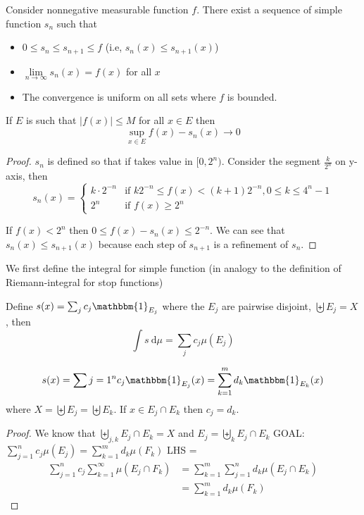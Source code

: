 \begin{theorem}
  Consider nonnegative measurable function $f$.
  There exist a sequence of simple function $s_n$ such that 
  \begin{itemize}
    \item $0 \le s_n \le s_{n+1} \le f$ (i.e, $s_n(x) \le s_{n+1}(x)$)
    \item $\lim\limits_{n\to\infty}s_n(x) = f(x)$ for all $x$
    \item The convergence is uniform on all sets where $f$ is bounded.
  \end{itemize}
    If $E$ is such that $|f(x)| \le M$ for all $x \in E$ then
    \[\sup_{x \in E} f(x) - s_n(x) \to 0\]
\end{theorem}

\begin{proof}
  $s_n$ is defined so that if takes value in $[0, 2^n)$. Consider the segment $\frac{k}{2^n}$ on y-axis,
  then $$s_n(x) = \begin{cases}
    k\cdot2^{-n} & \text{if } k2^{-n} \le f(x) < (k+1)2^{-n}, 0 \le k \le 4^n - 1 \\
    2^n & \text{if } f(x) \ge 2^n
  \end{cases}$$

If $f(x) < 2^n$ then $0 \le f(x) - s_n(x) \le 2^{-n}$. We can see that $s_n(x) \le s_{n+1}(x)$ because
each step of $s_{n+1}$ is a refinement of $s_n$.
\end{proof}

We first define the integral for simple function (in analogy to the definition of Riemann-integral for stop functions)
\begin{definition}
  Define 
  $s(x) = \sum_j c_j \mathbbm{1}_{E_j}$
  where the $E_j$ are pairwise disjoint, $\biguplus E_j = X$, then
  \[\int s \ \mathrm{d}\mu = \sum_j c_j \mu(E_j)\]
\end{definition}

\begin{claim}
  $$s(x) = \sum{j=1}^n c_j\mathbbm{1}_{E_j}(x) = \sum_{k = 1}^m d_k \mathbbm{1}_{E_k}(x)$$
  where $X = \biguplus E_j = \biguplus E_k$. If $x \in E_j \cap E_k$ then $c_j = d_k$.
\end{claim}

\begin{proof}
  We know that $\biguplus_{j, k} E_j \cap E_k = X$ and $E_j = \biguplus_{k} E_j \cap E_k$
  GOAL: $\sum_{j=1}^n c_j\mu(E_j) = \sum_{k=1}^m d_k \mu(F_k)$
  LHS = \begin{align*}
    \sum_{j=1}^n c_j \sum_{k=1}^\infty \mu(E_j \cap F_k) &= \sum_{k=1}^m \sum_{j=1}^n d_k \mu(E_j \cap E_k) \\
    &= \sum_{k=1}^m d_k \mu(F_k)
  \end{align*}
\end{proof}


